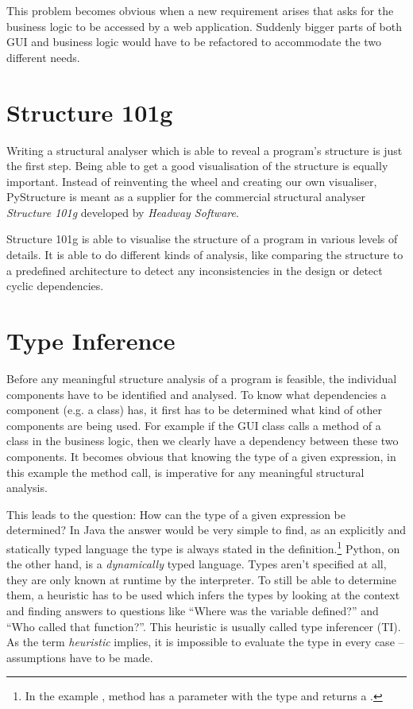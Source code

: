 \documentclass[12pt,halfparskip,DIV11,BCOR10mm]{scrreprt}
\begin{document}
This problem becomes obvious when a new requirement arises that asks for the business logic to be accessed by a web application. Suddenly bigger parts of both GUI and business logic would have to be refactored to accommodate the two different needs.

\section{Structure 101g}

Writing a structural analyser which is able to reveal a program's structure is just the first step. Being able to get a good visualisation of the structure is equally important. Instead of reinventing the wheel and creating our own visualiser, PyStructure is meant as a supplier for the commercial structural analyser \emph{Structure 101g} developed by \emph{Headway Software}.

Structure 101g is able to visualise the structure of a program in various levels of details. It is able to do different kinds of analysis, like comparing the structure to a predefined architecture to detect any inconsistencies in the design or detect cyclic dependencies.

\section{Type Inference}

Before any meaningful structure analysis of a program is feasible, the individual components have to be identified and analysed. To know what dependencies a component (e.g. a class) has, it first has to be determined what kind of other components are being used. For example if the GUI class calls a method of a class in the business logic, then we clearly have a dependency between these two components. It becomes obvious that knowing the type of a given expression, in this example the method call, is imperative for any meaningful structural analysis.

This leads to the question: How can the type of a given expression be determined? In Java the answer would be very simple to find, as an explicitly and statically typed language the type is always stated in the definition.\footnote{In the example , method  has a parameter  with the type  and returns a .} Python, on the other hand, is a \emph{dynamically} typed language. Types aren't specified at all, they are only known at runtime by the interpreter. To still be able to determine them, a heuristic has to be used which infers the types by looking at the context and finding answers to questions like ``Where was the variable defined?'' and ``Who called that function?''. This heuristic is usually called type inferencer (TI). As the term \emph{heuristic} implies, it is impossible to evaluate the type in every case -- assumptions have to be made.
\end{document}
